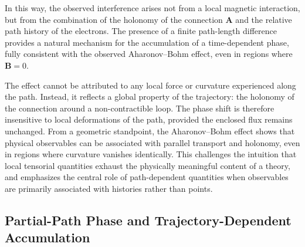 \documentclass[%
 reprint,
 amsmath,amssymb,
 aps,
 prb,
]{revtex4-2}
\numberwithin{equation}{section}
\begin{document}

In this way, the observed interference arises not from a local magnetic interaction, but from the combination of the holonomy of the connection \( \mathbf{A} \) and the relative path history of the electrons. The presence of a finite path-length difference provides a natural mechanism for the accumulation of a time-dependent phase, fully consistent with the observed Aharonov--Bohm effect, even in regions where \( \mathbf{B} = 0 \).


The effect cannot be attributed to any local force or curvature experienced along the path. Instead, it reflects a global property of the trajectory: the holonomy of the connection around a non-contractible loop. The phase shift is therefore insensitive to local deformations of the path, provided the enclosed flux remains unchanged. From a geometric standpoint, the Aharonov--Bohm effect shows that physical observables can be associated with parallel transport and holonomy, even in regions where curvature vanishes identically. This challenges the intuition that local tensorial quantities exhaust the physically meaningful content of a theory, and emphasizes the central role of path-dependent quantities when observables are primarily associated with histories rather than points.


\subsection{Partial-Path Phase and Trajectory-Dependent Accumulation}
\label{sec:ab_partial_path_phase}
\end{document}
